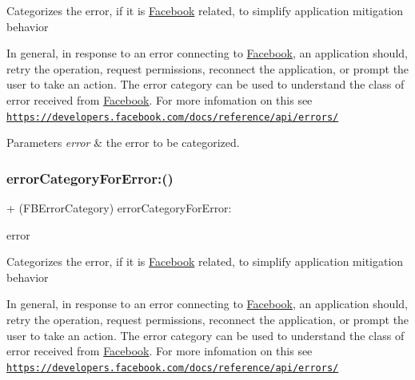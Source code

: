 Categorizes the error, if it is \hyperlink{interfaceFacebook}{Facebook} related, to simplify application mitigation behavior

In general, in response to an error connecting to \hyperlink{interfaceFacebook}{Facebook}, an application should, retry the operation, request permissions, reconnect the application, or prompt the user to take an action. The error category can be used to understand the class of error received from \hyperlink{interfaceFacebook}{Facebook}. For more infomation on this see \href{https://developers.facebook.com/docs/reference/api/errors/}{\tt https\+://developers.\+facebook.\+com/docs/reference/api/errors/}


\begin{DoxyParams}{Parameters}
{\em error} & the error to be categorized. \\
\hline
\end{DoxyParams}
\mbox{\label{interfaceFBErrorUtility_a708ac3cac2c06d5f9432a45e4ad67082}} 
\subsubsection{\texorpdfstring{error\+Category\+For\+Error\+:()}{errorCategoryForError:()}\hspace{0.1cm}{\footnotesize\ttfamily [3/5]}}
{\footnotesize\ttfamily + (F\+B\+Error\+Category) error\+Category\+For\+Error\+: \begin{DoxyParamCaption}\item[{(N\+S\+Error $\ast$)}]{error }\end{DoxyParamCaption}}

Categorizes the error, if it is \hyperlink{interfaceFacebook}{Facebook} related, to simplify application mitigation behavior

In general, in response to an error connecting to \hyperlink{interfaceFacebook}{Facebook}, an application should, retry the operation, request permissions, reconnect the application, or prompt the user to take an action. The error category can be used to understand the class of error received from \hyperlink{interfaceFacebook}{Facebook}. For more infomation on this see \href{https://developers.facebook.com/docs/reference/api/errors/}{\tt https\+://developers.\+facebook.\+com/docs/reference/api/errors/}


